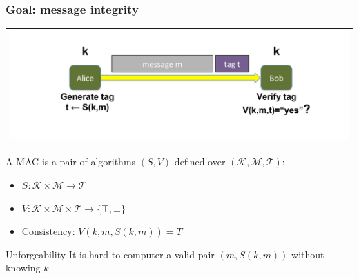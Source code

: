 \documentclass[aspectratio=169, lualatex, handout, 10pt,dvipsnames,svgnames]{beamer} %
\newcommand{\Kcal}{\mathcal{K}}
\newcommand{\Mcal}{\mathcal{M}}
\newcommand{\Tcal}{\mathcal{T}}
\begin{document}
\begin{frame}

  \frametitle{Goal: message integrity}
\vspace{-0.75cm}
  
  \begin{tabular}{l}
    \includegraphics[scale=0.4]{Images/integrity1.pdf}
  \end{tabular}
  \pause

\vspace{-0.3cm}
  A MAC is a pair of algorithms $(S, V)$ defined over $(\Kcal, \Mcal, \Tcal)$:
  \begin{itemize}
  \item $S: \Kcal \times \Mcal\rightarrow \Tcal$
  \item $V: \Kcal \times \Mcal \times \Tcal\rightarrow \{\top,\bot\}$
  \item Consistency: $V(k, m, S(k, m)) = T$
  \end{itemize}
  
  \begin{alertblock}{Unforgeability}
  It is hard to computer a valid pair $(m, S(k, m))$ without knowing $k$
  \end{alertblock}
\end{frame}
\end{document}
